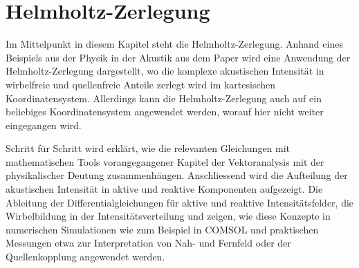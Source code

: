 %
%
%
%
\chapter{Helmholtz-Zerlegung\label{chapter:helmholtz}}
\begin{refsection}

Im Mittelpunkt in diesem Kapitel steht die Helmholtz-Zerlegung.
Anhand eines Beispiels aus der Physik in der Akustik aus dem Paper
\cite{helmholtz:paper}
wird eine Anwendung der Helmholtz-Zerlegung
dargestellt, wo die komplexe akustischen Intensität in wirbelfreie
und quellenfreie Anteile zerlegt wird im kartesischen Koordinatensystem.
Allerdings kann die Helmholtz-Zerlegung auch auf ein beliebiges
Koordinatensystem angewendet werden, worauf hier nicht weiter
eingegangen wird. \newline


Schritt für Schritt wird erklärt, wie die relevanten Gleichungen mit mathematischen Tools vorangegangener Kapitel der Vektoranalysis mit der physikalischer Deutung zusammenhängen. Anschliessend wird die Aufteilung der akustischen Intensität in aktive und reaktive Komponenten aufgezeigt. Die Ableitung der Differentialgleichungen für aktive und reaktive Intensitätsfelder, die Wirbelbildung in der Intensitätsverteilung und zeigen, wie diese Konzepte in numerischen Simulationen wie zum Beispiel in COMSOL und praktischen Messungen etwa zur Interpretation von Nah- und Fernfeld oder der Quellenkopplung angewendet werden.



%
%
%
%



%


\printbibliography[heading=subbibliography]
\end{refsection}

